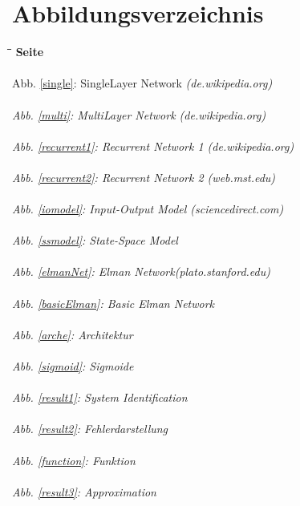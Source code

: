 \chapter*{Abbildungsverzeichnis}

\begin{tabbing}
	\hspace*{0.5cm}\=\hspace*{4.2cm}\=\hspace*{3cm}\=\hspace*{5cm}\= \kill
	 \> {\bf } \> {\bf } \> {\bf Seite} \\ \ \\
	\>Abb. \ref{single}: SingleLayer Network \itshape(de.wikipedia.org)\upshape \> \> \> \pageref{single} \\ \ \\
	\>Abb. \ref{multi}: MultiLayer Network \itshape(de.wikipedia.org)\upshape \> \> \> \pageref{multi} \\ \ \\
	\>Abb. \ref{recurrent1}: Recurrent Network 1 \itshape(de.wikipedia.org)\upshape \> \> \> \pageref{recurrent1} \\ \ \\
	\>Abb. \ref{recurrent2}: Recurrent Network 2 \itshape(web.mst.edu)\upshape \> \> \> \pageref{recurrent2} \\ \ \\
	\>Abb. \ref{iomodel}: Input-Output Model \itshape(sciencedirect.com)\upshape \> \> \> \pageref{iomodel} \\ \ \\
	\>Abb. \ref{ssmodel}: State-Space Model \> \> \> \pageref{ssmodel} \\ \ \\
	\>Abb. \ref{elmanNet}: Elman Network\itshape(plato.stanford.edu)\upshape \> \> \> \pageref{elmanNet} \\ \ \\
	\>Abb. \ref{basicElman}: Basic Elman Network \> \> \> \pageref{basicElman} \\ \ \\
	\>Abb. \ref{arche}: Architektur \> \> \> \pageref{arche} \\ \ \\
	\>Abb. \ref{sigmoid}: Sigmoide \> \> \> \pageref{sigmoid} \\ \ \\
	\>Abb. \ref{result1}: System Identification \> \> \> \pageref{result1} \\ \ \\
	\>Abb. \ref{result2}: Fehlerdarstellung \> \> \> \pageref{result2} \\ \ \\
	\>Abb. \ref{function}: Funktion \> \> \> \pageref{function} \\ \ \\
	\>Abb. \ref{result3}: Approximation \> \> \> \pageref{result3} \\ \ \\
\end{tabbing}